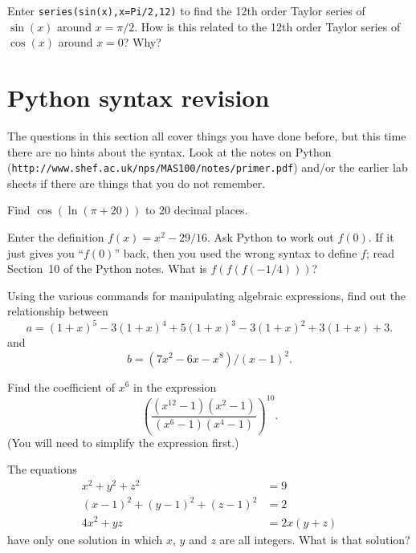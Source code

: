 \documentclass[a4paper,10pt]{amsbook}
\begin{document}
\begin{exercise}\label{ex-sin-shift}
 Enter \verb~series(sin(x),x=Pi/2,12)~ to find the 12th
 order Taylor series of $\sin(x)$ around $x=\pi/2$.  How
 is this related to the 12th order Taylor series of
 $\cos(x)$ around $x=0$?  Why? 
\end{exercise}

\section{Python syntax revision}

The questions in this section all cover things you have done
before, but this time there are no hints about the syntax. 
Look at the notes on Python
(\verb~http://www.shef.ac.uk/nps/MAS100/notes/primer.pdf~)
and/or the earlier lab sheets if there are things that you
do not remember. 

\begin{exercise}
 Find $\cos(\ln(\pi+20))$ to $20$ decimal places. 
\end{exercise}

\begin{exercise}
 Enter the definition $f(x)=x^2-29/16$.  Ask Python to work
 out $f(0)$.  If it just gives you ``$f(0)$'' back, then you
 used the wrong syntax to define $f$; read Section~10 of the
 Python notes.  What is $f(f(f(-1/4)))$? 
\end{exercise}

\begin{exercise}
 Using the various commands for manipulating
 algebraic expressions, find out the relationship between
 \[ a = (1+x)^5-3(1+x)^4+5(1+x)^3-3(1+x)^2+3(1+x)+3. \]
 and
 \[ b = (7x^2-6x-x^8)/(x-1)^2. \]
\end{exercise}

\begin{exercise}
 Find the coefficient of $x^6$ in the expression
 \[
  \left(\frac{(x^{12}-1)(x^2-1)}{(x^6-1)(x^4-1)}\right)^{10}. 
 \]
 (You will need to simplify the expression first.) 
\end{exercise}

\begin{exercise}
 The equations
 \begin{align*}
  x^2+y^2+z^2 &= 9 \\
  (x-1)^2 + (y-1)^2 + (z-1)^2 &= 2 \\
  4x^2+yz &= 2x(y+z) 
 \end{align*}
 have only one solution in which $x$, $y$ and $z$ are all
 integers.  What is that solution? 
\end{exercise}
\end{document}
